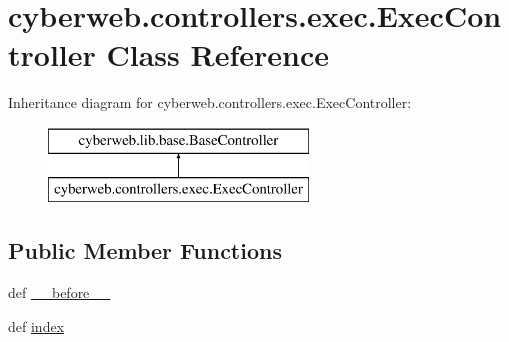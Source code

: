 \hypertarget{classcyberweb_1_1controllers_1_1exec_1_1_exec_controller}{\section{cyberweb.\-controllers.\-exec.\-Exec\-Controller \-Class \-Reference}
\label{classcyberweb_1_1controllers_1_1exec_1_1_exec_controller}
}
\-Inheritance diagram for cyberweb.\-controllers.\-exec.\-Exec\-Controller\-:\begin{figure}[H]
\begin{center}
\leavevmode
\includegraphics[height=2.000000cm]{classcyberweb_1_1controllers_1_1exec_1_1_exec_controller}
\end{center}
\end{figure}
\subsection*{\-Public \-Member \-Functions}
\begin{DoxyCompactItemize}
\item 
def \hyperlink{classcyberweb_1_1controllers_1_1exec_1_1_exec_controller_ac0b743209ae8b433b6624fb2e8b56ac3}{\-\_\-\-\_\-before\-\_\-\-\_\-}
\item 
def \hyperlink{classcyberweb_1_1controllers_1_1exec_1_1_exec_controller_aca53145a544384cb0d7fb28a122ab1c5}{index}
\end{DoxyCompactItemize}


